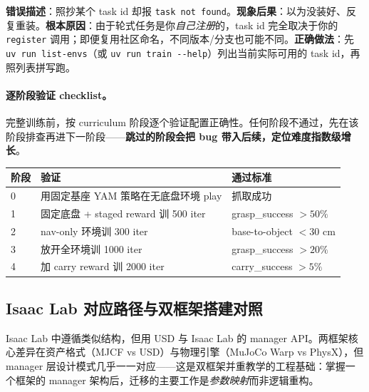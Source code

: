 \begin{pitfall}
\textbf{错误描述}：照抄某个 task id 却报 \verb|task not found|。\textbf{现象后果}：以为没装好、反复重装。\textbf{根本原因}：由于轮式任务是你\emph{自己注册}的，task id 完全取决于你的 \verb|register| 调用；即便复用社区命名，不同版本/分支也可能不同。\textbf{正确做法}：先 \verb|uv run list-envs|（或 \verb|uv run train --help|）列出当前实际可用的 task id，再照列表拼写跑。
\end{pitfall}

\paragraph{逐阶段验证 checklist。}完整训练前，按 curriculum 阶段逐个验证配置正确性。任何阶段不通过，先在该阶段排查再进下一阶段——\textbf{跳过的阶段会把 bug 带入后续，定位难度指数级增长}。

\begin{center}
\small
\begin{tabular}{@{}lll@{}}
\toprule
阶段 & 验证 & 通过标准 \\
\midrule
0 & 用固定基座 YAM 策略在无底盘环境 play & 抓取成功 \\
1 & 固定底盘 + staged reward 训 500 iter & grasp\_success $>50\%$ \\
2 & nav-only 环境训 300 iter & base-to-object $<30$ cm \\
3 & 放开全环境训 1000 iter & grasp\_success $>20\%$ \\
4 & 加 carry reward 训 2000 iter & carry\_success $>5\%$ \\
\bottomrule
\end{tabular}
\end{center}

\subsection{Isaac Lab 对应路径与双框架搭建对照}
\label{sec:rlmc-wh-isaac-integration}

Isaac Lab 中遵循类似结构，但用 USD 与 Isaac Lab 的 manager API。两框架核心差异在资产格式（MJCF vs USD）与物理引擎（MuJoCo Warp vs PhysX），但 manager 层设计模式几乎一一对应——这是双框架并重教学的工程基础：掌握一个框架的 manager 架构后，迁移的主要工作是\emph{参数映射}而非逻辑重构。


